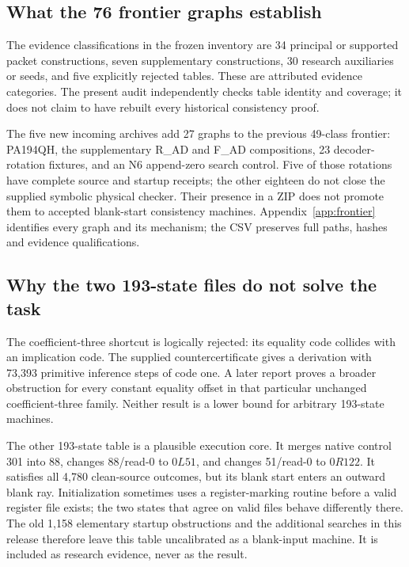 \documentclass[11pt]{article}
\theoremstyle{definition}\newtheorem{definition}[theorem]{Definition}
\begin{document}
\subsection{What the 76 frontier graphs establish}

The evidence classifications in the frozen inventory are 34 principal
or supported packet constructions, seven supplementary constructions,
30 research auxiliaries or seeds, and five explicitly rejected tables.
These are attributed evidence categories. The present audit independently
checks table identity and coverage; it does not claim to have rebuilt
every historical consistency proof.

The five new incoming archives add 27 graphs to the previous 49-class
frontier: PA194QH, the supplementary R\_AD and F\_AD compositions,
23 decoder-rotation fixtures, and an N6 append-zero search control.
Five of those rotations have complete source and startup receipts;
the other eighteen do not close the supplied symbolic physical checker.
Their presence in a ZIP does not promote them to accepted blank-start
consistency machines. Appendix~\ref{app:frontier} identifies every graph
and its mechanism; the CSV preserves full paths, hashes and evidence
qualifications.

\subsection{Why the two 193-state files do not solve the task}

The coefficient-three shortcut is logically rejected: its equality code
collides with an implication code. The supplied countercertificate gives
a derivation with 73,393 primitive inference steps of code one. A later report proves a
broader obstruction for every constant equality offset in that particular
unchanged coefficient-three family. Neither result is a lower bound for
arbitrary 193-state machines.

The other 193-state table is a plausible execution core. It merges native
control 301 into 88, changes 88/read-0 to $0L51$, and changes 51/read-0
to $0R122$. It satisfies all 4,780 clean-source outcomes, but its blank
start enters an outward blank ray. Initialization sometimes uses a
register-marking routine before a valid register file exists; the two
states that agree on valid files behave differently there. The old
1,158 elementary startup obstructions and the additional searches in
this release therefore leave this table uncalibrated as a blank-input
machine. It is included as research evidence, never as the result.
\end{document}
